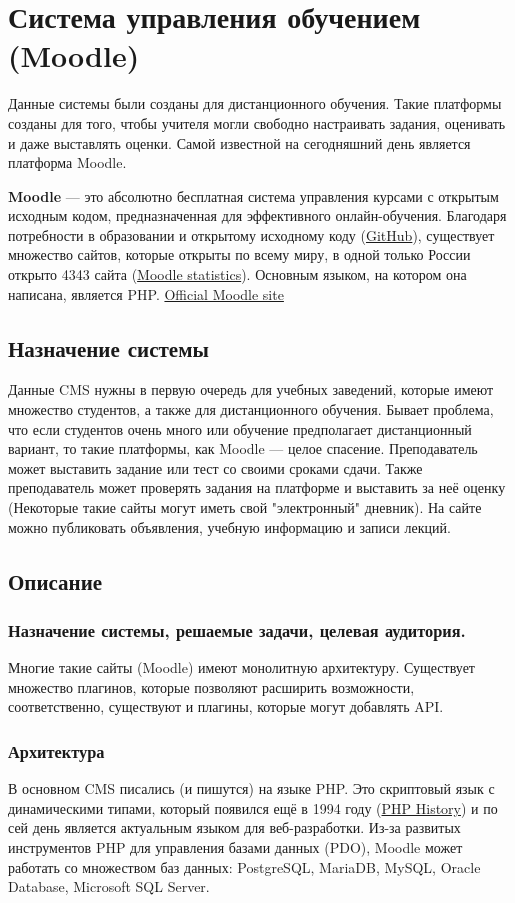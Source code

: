 \documentclass[a4paper, 14pt]{extarticle}
\begin{document}
\section{Система управления обучением (Moodle)}
Данные системы были созданы для дистанционного обучения. Такие
платформы созданы для того, чтобы учителя могли свободно настраивать
задания, оценивать и даже выставлять оценки. Самой известной на
сегодняшний день является платформа Moodle. \par
{\bfseries{Moodle}} --- это абсолютно бесплатная система управления
курсами с открытым исходным кодом, предназначенная для
эффективного онлайн-обучения.
Благодаря потребности в образовании и открытому исходному коду
(\href{https://github.com/moodle/moodle}{GitHub}), существует
множество сайтов, которые открыты по всему миру, в одной только России
открыто 4343 сайта (\href{https://stats.moodle.org}{Moodle
statistics}). Основным языком, на котором она написана, является PHP.
\href{https://moodle.org}{Official Moodle site}
\subsection{Назначение системы}
Данные CMS нужны в первую очередь для учебных заведений, которые
имеют множество студентов, а также для дистанционного обучения.
Бывает проблема, что если студентов очень много или обучение
предполагает дистанционный вариант, то такие платформы, как Moodle
--- целое спасение. Преподаватель может выставить задание или тест со
своими сроками сдачи. Также преподаватель может проверять задания
на платформе и выставить за неё оценку (Некоторые такие сайты могут
иметь свой "электронный" дневник). На сайте можно публиковать
объявления, учебную информацию и записи лекций.
\subsection{Описание}
\subsubsection{Назначение системы, решаемые задачи, целевая аудитория.}
Многие такие сайты (Moodle) имеют монолитную архитектуру. Существует
множество плагинов, которые позволяют расширить возможности,
соответственно, существуют и плагины, которые могут добавлять API.
\subsubsection{Архитектура}
В основном CMS писались (и пишутся) на языке PHP. Это скриптовый язык
с динамическими типами, который появился ещё в 1994 году
(\href{https://www.php.net/manual/en/history.php.php}{PHP History}) и
по сей день является актуальным языком для веб-разработки. Из-за
развитых инструментов PHP для управления базами данных (PDO), Moodle
может работать со множеством баз данных: PostgreSQL, MariaDB, MySQL,
Oracle Database, Microsoft SQL Server.
\end{document}
